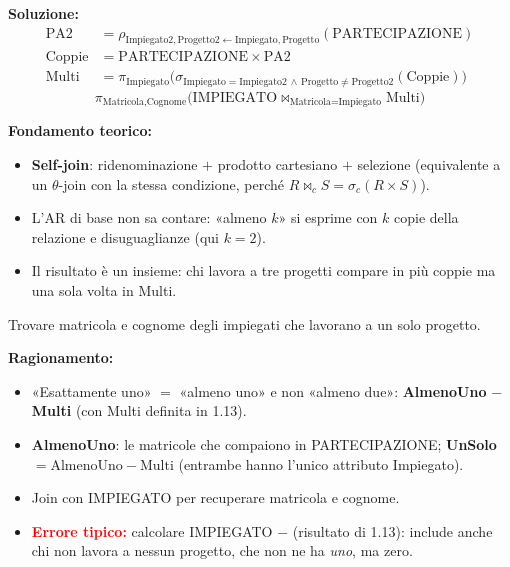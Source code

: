 \documentclass[12pt, a4paper]{article}
\begin{document}
\textbf{Soluzione:}
\begin{align*}
\text{PA2} &= \rho_{\text{Impiegato2},\text{Progetto2}\leftarrow\text{Impiegato},\text{Progetto}}(\text{PARTECIPAZIONE})\\
\text{Coppie} &= \text{PARTECIPAZIONE}\times\text{PA2}\\
\text{Multi} &= \pi_{\text{Impiegato}}\big(\sigma_{\text{Impiegato}=\text{Impiegato2}\,\land\,\text{Progetto}\neq\text{Progetto2}}(\text{Coppie})\big)
\end{align*}
$$\pi_{\text{Matricola},\text{Cognome}}\big(\text{IMPIEGATO}\bowtie_{\text{Matricola}=\text{Impiegato}}\text{Multi}\big)$$

\textbf{Fondamento teorico:}
\begin{itemize}
\item \textbf{Self-join}: ridenominazione $+$ prodotto cartesiano $+$ selezione (equivalente a un $\theta$-join con la stessa condizione, perché $R\bowtie_c S=\sigma_c(R\times S)$).
\item L'AR di base non sa contare: «almeno $k$» si esprime con $k$ copie della relazione e disuguaglianze (qui $k=2$).
\item Il risultato è un insieme: chi lavora a tre progetti compare in più coppie ma una sola volta in Multi.
\end{itemize}

\begin{tcolorbox}[colback=lightergray!10, colframe=tocsec, title=\textbf{Esercizio 1.14}]
Trovare matricola e cognome degli impiegati che lavorano a un solo progetto.
\end{tcolorbox}

\textbf{Ragionamento:}
\begin{itemize}
\item «Esattamente uno» $=$ «almeno uno» e non «almeno due»: \textbf{AlmenoUno} $-$ \textbf{Multi} (con Multi definita in 1.13).
\item \textbf{AlmenoUno}: le matricole che compaiono in PARTECIPAZIONE; \textbf{UnSolo} $=\text{AlmenoUno}-\text{Multi}$ (entrambe hanno l'unico attributo Impiegato).
\item Join con IMPIEGATO per recuperare matricola e cognome.
\item \textcolor{red}{\textbf{Errore tipico:}} calcolare IMPIEGATO $-$ (risultato di 1.13): include anche chi non lavora a nessun progetto, che non ne ha \emph{uno}, ma zero.
\end{itemize}
\end{document}
